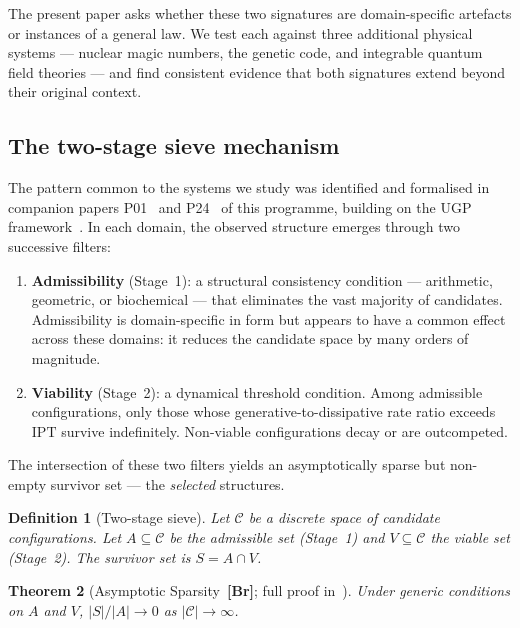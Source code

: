 \documentclass[11pt]{article}
\newtheorem{theorem}{Theorem}[section]
\newtheorem{definition}[theorem]{Definition}
\theoremstyle{remark}
\newcommand{\IPT}{\mathrm{IPT}}
\begin{document}
The present paper asks whether these two signatures are domain-specific artefacts
or instances of a general law.
We test each against three additional physical systems --- nuclear magic numbers,
the genetic code, and integrable quantum field theories --- and find consistent evidence
that both signatures extend beyond their original context.

\subsection{The two-stage sieve mechanism}

The pattern common to the systems we study was identified and formalised in
companion papers P01~\cite{Spivack2026_SM_UGP} and P24~\cite{Spivack2026_Uniqueness25}
of this programme, building on the UGP framework~\cite{SpivackUGP,Spivack2025_ParticlePhysics}.
In each domain, the observed structure emerges through two successive filters:
\begin{enumerate}[leftmargin=2em,itemsep=2pt]
  \item \textbf{Admissibility} (Stage~1): a structural consistency condition ---
        arithmetic, geometric, or biochemical --- that eliminates the vast majority of
        candidates.
        Admissibility is domain-specific in form but appears to have a common effect
        across these domains: it reduces the candidate space by many orders of magnitude.
  \item \textbf{Viability} (Stage~2): a dynamical threshold condition.
        Among admissible configurations, only those whose generative-to-dissipative
        rate ratio exceeds $\IPT$ survive indefinitely.
        Non-viable configurations decay or are outcompeted.
\end{enumerate}
The intersection of these two filters yields an asymptotically sparse but
non-empty survivor set --- the \emph{selected} structures.

\begin{definition}[Two-stage sieve]
Let $\mathcal{C}$ be a discrete space of candidate configurations.
Let $A \subseteq \mathcal{C}$ be the admissible set (Stage~1) and
$V \subseteq \mathcal{C}$ the viable set (Stage~2).
The \emph{survivor set} is $S = A \cap V$.
\end{definition}

\begin{theorem}[Asymptotic Sparsity~\textbf{[Br]}; full proof in~\cite{Spivack2026_SM_UGP,SpivackUGP}]
\label{thm:sparsity}
Under generic conditions on $A$ and $V$, $|S|/|A| \to 0$ as $|\mathcal{C}| \to \infty$.
\end{theorem}
\end{document}
